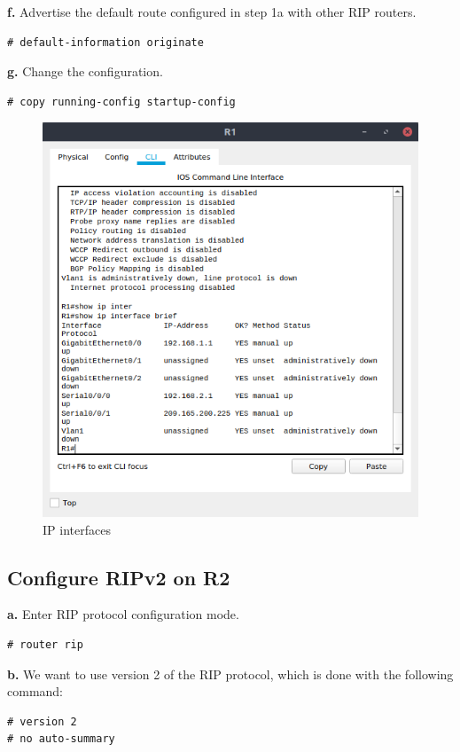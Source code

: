 \documentclass[conference]{IEEEtran}
\begin{document}
\textbf{f.} Advertise the default route configured in step 1a with other RIP routers.
\begin{verbatim}
# default-information originate
\end{verbatim}

\textbf{g.} Change the configuration.
\begin{verbatim}
# copy running-config startup-config
\end{verbatim}
\begin{center}
\begin{figure}[h]
\includegraphics[scale=0.45]{../q01g.png}
\caption{IP interfaces}
\end{figure}
\end{center}

\subsection{Configure RIPv2 on R2}

\textbf{a.} Enter RIP protocol configuration mode.
\begin{verbatim}
# router rip
\end{verbatim}

\textbf{b.} We want to use version 2 of the RIP protocol, which is done with the following command:
\begin{verbatim}
# version 2
# no auto-summary
\end{verbatim}
\end{document}
